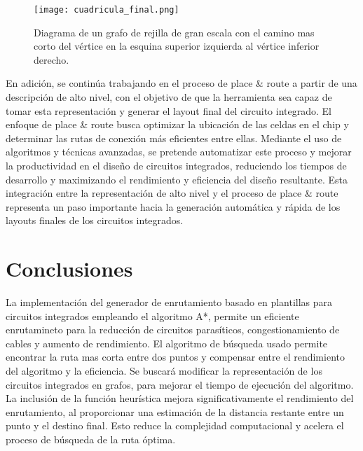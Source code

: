 \documentclass[reprint,amsmath,amssymb,aps]{revtex4-2}
\begin{document}
\begin{figure}[H]
	\centering
	\texttt{[image: cuadricula\_final.png]}
	\caption{Diagrama de un grafo de rejilla de gran escala con el camino mas corto del vértice en la esquina superior izquierda al vértice inferior derecho.}
	\label{cuadricula_final}
\end{figure}

En adición, se continúa trabajando en el proceso de place \& route a partir de una descripción de alto nivel, con el objetivo de que la herramienta sea capaz de tomar esta representación y generar el layout final del circuito integrado. El enfoque de place \& route busca optimizar la ubicación de las celdas en el chip y determinar las rutas de conexión más eficientes entre ellas. Mediante el uso de algoritmos y técnicas avanzadas, se pretende automatizar este proceso y mejorar la productividad en el diseño de circuitos integrados, reduciendo los tiempos de desarrollo y maximizando el rendimiento y eficiencia del diseño resultante. Esta integración entre la representación de alto nivel y el proceso de place \& route representa un paso importante hacia la generación automática y rápida de los layouts finales de los circuitos integrados.

\section{Conclusiones}

La implementación del generador de enrutamiento basado en plantillas para circuitos integrados empleando el algoritmo A*, permite un eficiente enrutamineto para la reducción de circuitos parasíticos, congestionamiento de cables y aumento de rendimiento. El algoritmo de búsqueda usado permite encontrar la ruta mas corta entre dos puntos y compensar entre el rendimiento del algoritmo y la eficiencia. Se buscará modificar la representación de los circuitos integrados en grafos, para mejorar el tiempo de ejecución del algoritmo. La inclusión de la función heurística mejora significativamente el rendimiento del enrutamiento, al proporcionar una estimación de la distancia restante entre un punto y el destino final. Esto reduce la complejidad computacional y acelera el proceso de búsqueda de la ruta óptima.
  

\nocite{*}
\end{document}
